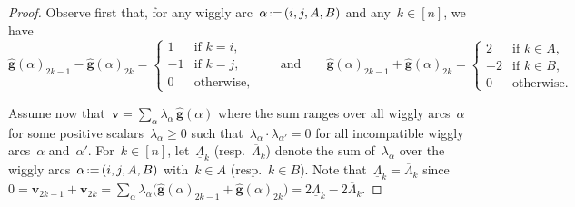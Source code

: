 \documentclass{amsart}
\theoremstyle{definition}
\renewcommand{\b}[1]{{\boldsymbol{#1}}} %
\newcommand{\eqdef}{\mbox{\,\raisebox{0.2ex}{\scriptsize\ensuremath{\mathrm:}}\ensuremath{=}\,}} %
\begin{document}
\begin{proof}
Observe first that, for any wiggly arc~$\alpha \eqdef (i, j, A, B)$ and any~$k \in [n]$, we have
\[
\hat{\b{g}}(\alpha)_{2k-1} - \hat{\b{g}}(\alpha)_{2k} = \begin{cases} 1 & \text{if~$k = i$,} \\ -1 & \text{if~$k = j$,} \\ 0 & \text{otherwise}, \end{cases}
\qquad\text{and}\qquad
\hat{\b{g}}(\alpha)_{2k-1} + \hat{\b{g}}(\alpha)_{2k} = \begin{cases} 2 & \text{if~$k \in A$,} \\ -2 & \text{if~$k \in B$,} \\ 0 & \text{otherwise}. \end{cases}
\]

Assume now that~$\b{v} = \sum_\alpha \lambda_\alpha \, \hat{\b{g}}(\alpha)$ where the sum ranges over all wiggly arcs~$\alpha$ for some positive scalars~$\lambda_\alpha \ge 0$ such that~$\lambda_\alpha \cdot \lambda_{\alpha'} = 0$ for all incompatible wiggly arcs~$\alpha$ and~$\alpha'$.
For~$k \in [n]$, let~$\underline{\Lambda}_k$ (resp.~$\overline{\Lambda}_k$) denote the sum of~$\lambda_\alpha$ over the wiggly arcs~$\alpha \eqdef (i, j, A, B)$ with~$k \in A$ (resp.~$k \in B$).
Note that~$\underline{\Lambda}_k = \overline{\Lambda}_k$ since~$0 = \b{v}_{2k-1} + \b{v}_{2k} = \sum_\alpha \lambda_\alpha \big( \hat{\b{g}}(\alpha)_{2k-1} + \hat{\b{g}}(\alpha)_{2k} \big) = 2\underline{\Lambda}_k - 2\overline{\Lambda}_k$.


\end{proof}
\end{document}
